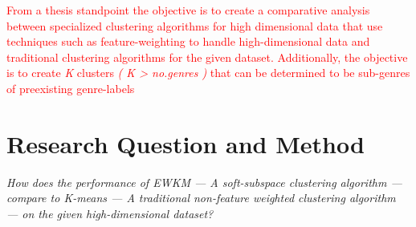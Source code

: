 \documentclass[a4paper,11pt]{article}
\begin{document}
\textcolor{red}{From a thesis standpoint the objective is to create a comparative analysis between specialized clustering algorithms for high dimensional data that use techniques such as feature-weighting to handle high-dimensional data and traditional clustering algorithms for the given dataset.}
\textcolor{red}{Additionally, the objective is to create \textit{K} clusters \textit{( K > no.genres )} that can be determined to be sub-genres of preexisting genre-labels}

\section{Research Question and Method}






\textit{How does the performance of EWKM --- A soft-subspace clustering algorithm --- compare to K-means --- A traditional non-feature weighted clustering algorithm --- on the given high-dimensional dataset?}


\end{document}
